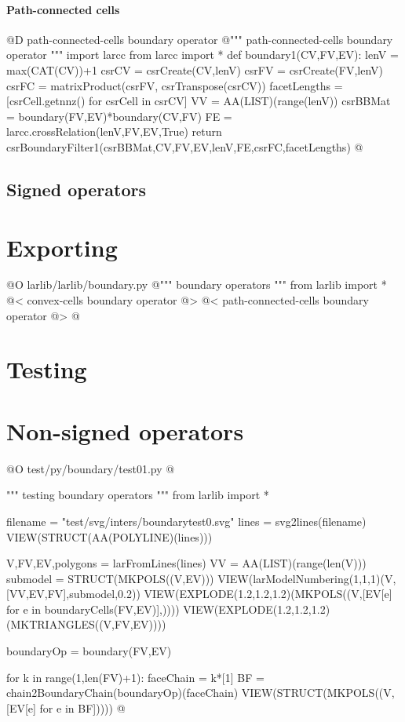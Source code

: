 \documentclass[11pt,oneside]{article}	%
\begin{document}
\paragraph{Path-connected cells}

@D path-connected-cells boundary operator
@{""" path-connected-cells boundary operator """
import larcc
from larcc import *
def boundary1(CV,FV,EV):
    lenV = max(CAT(CV))+1
    csrCV = csrCreate(CV,lenV)
    csrFV = csrCreate(FV,lenV)
    csrFC = matrixProduct(csrFV, csrTranspose(csrCV))
    facetLengths = [csrCell.getnnz() for csrCell in csrCV]
    VV = AA(LIST)(range(lenV))
    csrBBMat = boundary(FV,EV)*boundary(CV,FV)
    FE = larcc.crossRelation(lenV,FV,EV,True)
    return csrBoundaryFilter1(csrBBMat,CV,FV,EV,lenV,FE,csrFC,facetLengths)
@}

\subsection{Signed operators}


\section{Exporting}

@O larlib/larlib/boundary.py
@{""" boundary operators """
from larlib import *
@< convex-cells boundary operator @>
@< path-connected-cells boundary operator @>
@}


\section{Testing}

\section{Non-signed operators}


@O test/py/boundary/test01.py
@{""" testing boundary operators """
from larlib import *

filename = "test/svg/inters/boundarytest0.svg"
lines = svg2lines(filename)
VIEW(STRUCT(AA(POLYLINE)(lines)))
    
V,FV,EV,polygons = larFromLines(lines)
VV = AA(LIST)(range(len(V)))
submodel = STRUCT(MKPOLS((V,EV)))
VIEW(larModelNumbering(1,1,1)(V,[VV,EV,FV],submodel,0.2))
VIEW(EXPLODE(1.2,1.2,1.2)(MKPOLS((V,[EV[e] for e in boundaryCells(FV,EV)],))))
VIEW(EXPLODE(1.2,1.2,1.2)(MKTRIANGLES((V,FV,EV))))

boundaryOp = boundary(FV,EV)

for k in range(1,len(FV)+1):
    faceChain = k*[1]
    BF = chain2BoundaryChain(boundaryOp)(faceChain)
    VIEW(STRUCT(MKPOLS((V,[EV[e] for e in BF]))))
@}
\end{document}
